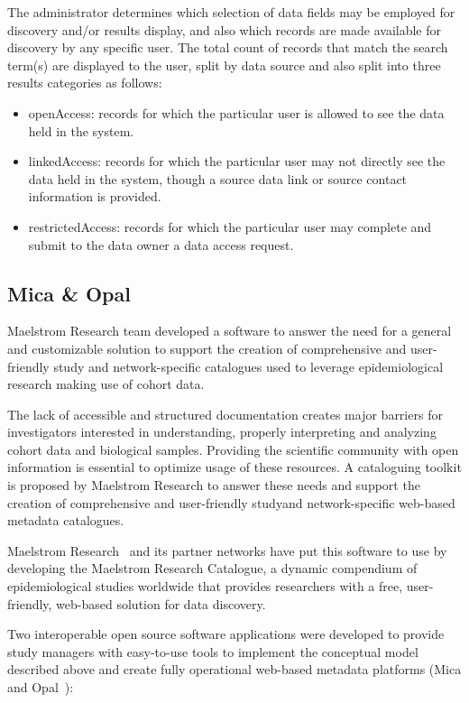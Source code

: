 The administrator determines which selection of data fields may be employed for
discovery and/or results display, and also which records are made available for
discovery by any specific user.
The total count of records that match the search term(s) are displayed to the user,
split by data source and also split into three results categories as follows:
\begin{itemize}
    \item openAccess: records for which the particular user is allowed to see the data
        held in the system.
    \item linkedAccess: records for which the particular user may not directly see the
        data held in the system, though a source data link or source contact
        information is provided.
    \item restrictedAccess: records for which the particular user may complete and
        submit to the data owner a data access request.
\end{itemize}

\subsection*{Mica \& Opal}
Maelstrom Research team developed a software to answer the need for a general and customizable solution to support the creation of comprehensive and user-friendly study and network-specific catalogues used to leverage epidemiological research making use of cohort data.

The lack of accessible and structured documentation creates major barriers for investigators interested in understanding, properly interpreting and analyzing cohort data and biological samples.
Providing the scientific community with open information is essential to optimize usage of these resources.
A cataloguing toolkit is proposed by Maelstrom Research to answer these needs and support the creation of comprehensive and user-friendly studyand network-specific web-based metadata catalogues.


Maelstrom Research~\cite{maelstrom} and its partner networks have put this software to use by developing the Maelstrom Research Catalogue, a dynamic compendium of epidemiological studies worldwide that provides researchers with a free, user-friendly, web-based solution for data discovery.


Two interoperable open source software applications were developed to provide study managers with easy-to-use tools to implement the conceptual model described above and create fully operational web-based metadata platforms (Mica and Opal~\cite{mica}):


